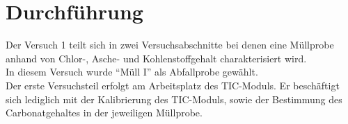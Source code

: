 \chapter{Durchführung}
\label{sec:durchfuerung}

Der Versuch 1 teilt sich in zwei Versuchsabschnitte bei denen eine Müllprobe anhand von Chlor-, Asche- und Kohlenstoffgehalt charakterisiert wird. \\
In diesem Versuch wurde "`Müll I"' als Abfallprobe gewählt.\\ 

Der erste Versuchsteil erfolgt am Arbeitsplatz des TIC-Moduls. Er beschäftigt sich lediglich mit der Kalibrierung des TIC-Moduls, sowie der Bestimmung des Carbonatgehaltes in der jeweiligen Müllprobe.\\

